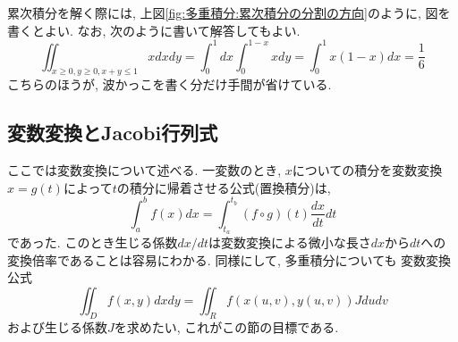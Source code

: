 \documentclass[a4j,dvipdfmx]{jsarticle}
\numberwithin{equation}{section}
\begin{document}
            累次積分を解く際には, 上図\ref{fig:多重積分:累次積分の分割の方向}のように, 図を書くとよい. なお, 次のように書いて解答してもよい.
            \begin{equation*}
                \iint_{x\geq0,y\geq0,x+y\leq 1}xdxdy=\int_0^1dx\int_{0}^{1-x}xdy=\int_{0}^{1}x(1-x)dx=\frac{1}{6}
            \end{equation*}
            こちらのほうが, 波かっこを書く分だけ手間が省けている.
        \clearpage
        \subsection{変数変換とJacobi行列式}
            ここでは変数変換について述べる. 一変数のとき, $x$についての積分を変数変換$x=g(t)$によって$t$の積分に帰着させる公式(置換積分)は, 
            \begin{equation}
                \int_{a}^{b}f(x)dx=\int_{t_a}^{t_b}(f\circ g)(t)\frac{dx}{dt}dt
            \end{equation}
            であった. このとき生じる係数$dx/dt$は変数変換による微小な長さ$dx$から$dt$への変換倍率であることは容易にわかる. 同様にして, 多重積分についても
            変数変換公式
            \begin{equation*}
                \iint_D f(x,y)dxdy=\iint_R f(x(u,v),y(u,v))Jdudv
            \end{equation*}
            および生じる係数$J$を求めたい, これがこの節の目標である.
\end{document}
